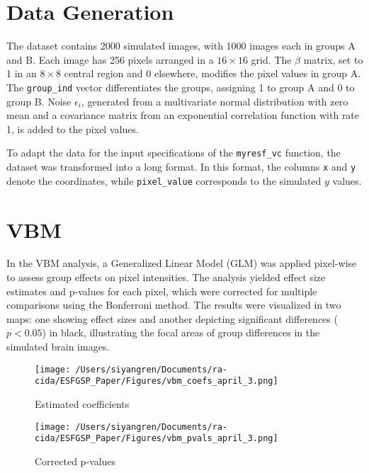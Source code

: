 \documentclass[12pt]{article}
\begin{document}
\section*{Data Generation}

The dataset contains 2000 simulated images, with 1000 images each in groups A and B. Each image has 256 pixels arranged in a \(16 \times 16\) grid. The \(\beta\) matrix, set to 1 in an \(8 \times 8\) central region and 0 elsewhere, modifies the pixel values in group A. The \texttt{group\_ind} vector differentiates the groups, assigning 1 to group A and 0 to group B. Noise \(\epsilon_i\), generated from a multivariate normal distribution with zero mean and a covariance matrix from an exponential correlation function with rate 1, is added to the pixel values.

To adapt the data for the input specifications of the \texttt{myresf\_vc} function, the dataset was transformed into a long format. In this format, the columns \texttt{x} and \texttt{y} denote the coordinates, while \texttt{pixel\_value} corresponds to the simulated $y$ values.

\section*{VBM}

In the VBM analysis, a Generalized Linear Model (GLM) was applied pixel-wise to assess group effects on pixel intensities. The analysis yielded effect size estimates and p-values for each pixel, which were corrected for multiple comparisons using the Bonferroni method. The results were visualized in two maps: one showing effect sizes and another depicting significant differences (\(p < 0.05\)) in black, illustrating the focal areas of group differences in the simulated brain images.

\begin{figure}[ht]
    \centering
    \begin{minipage}[b]{0.45\textwidth}
        \texttt{[image: /Users/siyangren/Documents/ra-cida/ESFGSP\_Paper/Figures/vbm\_coefs\_april\_3.png]}
        \caption{Estimated coefficients}
        \label{fig:first_image}
    \end{minipage}
    \hfill %
    \begin{minipage}[b]{0.45\textwidth}
        \texttt{[image: /Users/siyangren/Documents/ra-cida/ESFGSP\_Paper/Figures/vbm\_pvals\_april\_3.png]}
        \caption{Corrected p-values}
        \label{fig:second_image}
    \end{minipage}
\end{figure}
\end{document}
